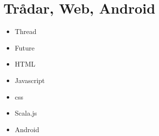 \chapter{Trådar, Web, Android}\label{chapter:W12}
\begin{multicols}{2}\begin{itemize}[nosep,label={$\square$}]
\item Thread
\item Future
\item HTML
\item Javascript
\item css
\item Scala.js
\item Android\end{itemize}\end{multicols}
